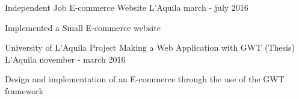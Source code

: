 \begin{cventries}
\cventry
{Independent Job} %
{E-commerce Website} %
{L'Aquila} %
{march - july 2016} %
{ %
\begin{cvitems}
\item {Implemented a Small E-commerce website}
\end{cvitems}
}

\cventry
{University of L'Aquila Project} %
{Making a Web Application with GWT (Thesis)} %
{L'Aquila} %
{november - march 2016} %
{ %
	\begin{cvitems}
		\item {Design and implementation of an E-commerce through the use of the GWT framework}
	\end{cvitems}
}


\end{cventries}